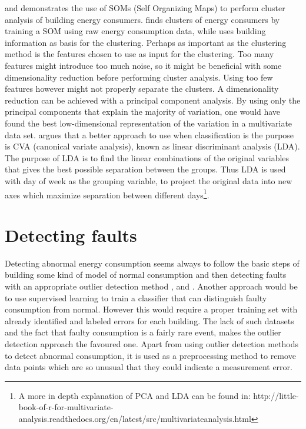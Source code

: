 \cite{Benchmarking1} and \cite{Benchmarking2} demonstrates the use of SOMs (Self Organizing Maps) to perform cluster analysis of building energy consumers. \cite{Benchmarking1} finds clusters of energy consumers by training a SOM using raw energy consumption data, while \cite{Benchmarking2} uses building information as basis for the clustering.
Perhaps as important as the clustering method is the features chosen to use as input for the clustering. Too many features might introduce too much noise, so it might be beneficial with some dimensionality reduction before performing cluster analysis. Using too few features however might not properly separate the clusters. A dimensionality reduction can be achieved with a principal component analysis. By using only the principal components that explain the majority of variation, one would have found the best low-dimensional representation of the variation in a multivariate data set. \cite{faultdetec2} argues that a better approach to use when classification is the purpose is CVA (canonical variate analysis), known as linear discriminant analysis (LDA). The purpose of LDA is to find the linear combinations of the original variables that gives the best possible separation between the groups. Thus LDA is used with day of week as the grouping variable, to project the original data into new axes which maximize separation between different days\footnote{A more in depth explanation of PCA and LDA can be found in: http://little-book-of-r-for-multivariate-analysis.readthedocs.org/en/latest/src/multivariateanalysis.html}.
\section{Detecting faults}
Detecting abnormal energy consumption seems always to follow the basic steps of building some kind of model of normal consumption and then detecting faults with an appropriate outlier detection method \cite{faultdetec1}, \cite{faultdetec2} and \cite{faultdetec3}. Another approach would be to use supervised learning to train a classifier that can distinguish faulty consumption from normal. However this would require a proper training set with already identified and labeled errors for each building. The lack of such datasets and the fact that faulty consumption is a fairly rare event, makes the outlier detection approach the favoured one. Apart from using outlier detection methods to detect abnormal consumption, it is used as a preprocessing method to remove data points which are so unusual that they could indicate a measurement error.

